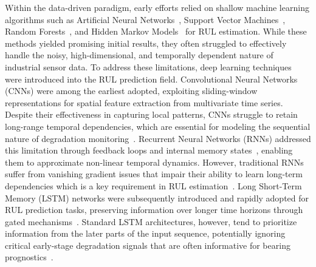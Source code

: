 Within the data-driven paradigm, early efforts relied on shallow
machine learning algorithms such as Artificial Neural
Networks~\cite{KHATIR2020102554}, Support Vector
Machines~\cite{TRAN2012320}, Random Forests~\cite{7508982randomforest},
and Hidden Markov Models~\cite{articleHiddenmarkov} for RUL estimation.
While these methods yielded promising initial results, they often
struggled to effectively handle the noisy, high-dimensional, and
temporally dependent nature of industrial sensor data. To address
these limitations, deep learning techniques were introduced into
the RUL prediction field. Convolutional Neural Networks (CNNs) were
among the earliest adopted, exploiting sliding-window representations
for spatial feature extraction from multivariate time series. Despite
their effectiveness in capturing local patterns, CNNs struggle to
retain long-range temporal dependencies, which are essential for
modeling the sequential nature of degradation
monitoring~\cite{shang_capsule_2024, pan2025remaining}. Recurrent
Neural Networks (RNNs) addressed this limitation through feedback
loops and internal memory states~\cite{articleRNNRUL}, enabling them
to approximate non-linear temporal dynamics. However, traditional RNNs
suffer from vanishing gradient issues that impair their ability to
learn long-term dependencies which is a key requirement in RUL
estimation~\cite{heimes_recurrent_2008}. Long Short-Term Memory
(LSTM) networks were subsequently introduced and rapidly adopted
for RUL prediction tasks, preserving information over longer time
horizons through gated mechanisms~\cite{inproceedingsLSTM}. Standard
LSTM architectures, however, tend to prioritize information from the
later parts of the input sequence, potentially ignoring critical
early-stage degradation signals that are often informative for bearing
prognostics~\cite{bai_towards_2024}.\\

